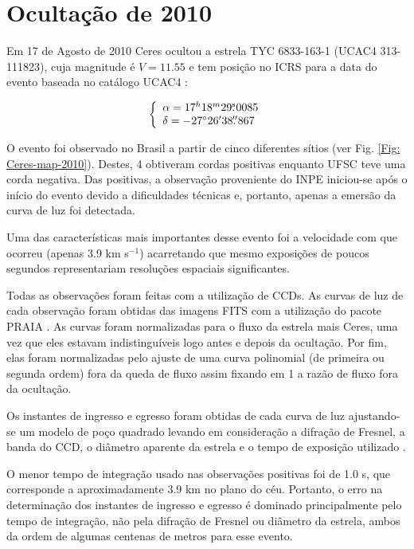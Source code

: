 \documentclass[12pt,a4paper]{monografia}
\newcommand{\degr}{\ensuremath{^{\circ}}}%
\newcommand{\arcmin}{\ensuremath{^{\prime}}}%
\newcommand{\fs}{\mbox{\ensuremath{.\!\!^s}}}
\newcommand{\farcs}{\mbox{\ensuremath{.\!\!^{\prime\prime}}}}%
\begin{document}
\section{Ocultação de 2010}
\label{Sec: Ceres-2010-occ}

\indent \indent Em 17 de Agosto de 2010 Ceres ocultou a estrela TYC 6833-163-1 (UCAC4 313-111823), cuja magnitude é $V = 11.55$ e tem posição no ICRS para a data do evento baseada no catálogo UCAC4 \citep{Zacharias2013}:

\begin{equation}
\left\{ 
  \begin{array}{l l}
    \alpha = 17^{h}18^{m}29\fs 0085\\
    \delta = -27\degr 26\arcmin 38\farcs 867
  \end{array}
\right.
\label{Eq: 2010-coord}
\end{equation}

\indent O evento foi observado no Brasil a partir de cinco diferentes sítios (ver Fig. \ref{Fig: Ceres-map-2010}). Destes, 4 obtiveram cordas positivas enquanto UFSC teve uma corda negativa. Das positivas, a observação proveniente do INPE iniciou-se após o início do evento devido a dificuldades técnicas e, portanto, apenas a emersão da curva de luz foi detectada.

Uma das características mais importantes desse evento foi a velocidade com que ocorreu (apenas 3.9 km s$^{-1}$) acarretando que mesmo exposições de poucos segundos representariam resoluções espaciais significantes.

Todas as observações foram feitas com a utilização de CCDs. As curvas de luz de cada observação foram obtidas das imagens FITS com a utilização do pacote PRAIA \citep[Plataforma de Redução Astrométrica de Imagens Astronômicas,][]{Assafin2011}. As curvas foram normalizadas para o fluxo da estrela mais Ceres, uma vez que eles estavam indistinguíveis logo antes e depois da ocultação. Por fim, elas foram normalizadas pelo ajuste de uma curva polinomial (de primeira ou segunda ordem) fora da queda de fluxo assim fixando em 1 a razão de fluxo fora da ocultação.

Os instantes de ingresso e egresso foram obtidas de cada curva de luz ajustando-se um modelo de poço quadrado levando em consideração a difração de Fresnel, a banda do CCD, o diâmetro aparente da estrela e o tempo de exposição utilizado \citep[ver][]{Widemann2009, Braga-Ribas2013}.

O menor tempo de integração usado nas observações positivas foi de 1.0 s, que corresponde a aproximadamente 3.9 km no plano do céu. Portanto, o erro na determinação dos instantes de ingresso e egresso é dominado principalmente pelo tempo de integração, não pela difração de Fresnel ou diâmetro da estrela, ambos da ordem de algumas centenas de metros para esse evento.
\end{document}
